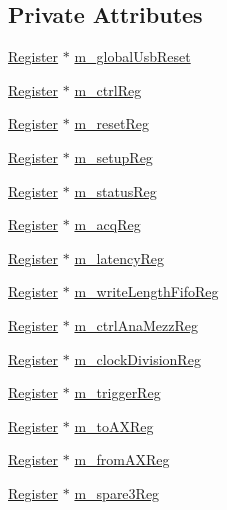 \subsection*{Private Attributes}
\begin{DoxyCompactItemize}
\item 
\hyperlink{classRegister}{Register} $\ast$ \hyperlink{classA3PE_abd71e0c273f9e211e1a9302019129aff}{m\+\_\+global\+Usb\+Reset}
\item 
\hyperlink{classRegister}{Register} $\ast$ \hyperlink{classA3PE_a264834484dd6326ebad58c2a3e1be9a6}{m\+\_\+ctrl\+Reg}
\item 
\hyperlink{classRegister}{Register} $\ast$ \hyperlink{classA3PE_ab4db5f00976e5095686f108c8febf702}{m\+\_\+reset\+Reg}
\item 
\hyperlink{classRegister}{Register} $\ast$ \hyperlink{classA3PE_a142fa10b7e705c4701ae21678ec2ec8a}{m\+\_\+setup\+Reg}
\item 
\hyperlink{classRegister}{Register} $\ast$ \hyperlink{classA3PE_a2281e3d12a2dffad99ec55be2b695f53}{m\+\_\+status\+Reg}
\item 
\hyperlink{classRegister}{Register} $\ast$ \hyperlink{classA3PE_abaf426f4c9192537117b77f9f4821e04}{m\+\_\+acq\+Reg}
\item 
\hyperlink{classRegister}{Register} $\ast$ \hyperlink{classA3PE_a96a167e73e264da5a18d9ddb5ebb5f23}{m\+\_\+latency\+Reg}
\item 
\hyperlink{classRegister}{Register} $\ast$ \hyperlink{classA3PE_a9a0cb2253ea34c0be567a03684217fee}{m\+\_\+write\+Length\+Fifo\+Reg}
\item 
\hyperlink{classRegister}{Register} $\ast$ \hyperlink{classA3PE_a126a936a5fd4fd4b83485b3637e1fa84}{m\+\_\+ctrl\+Ana\+Mezz\+Reg}
\item 
\hyperlink{classRegister}{Register} $\ast$ \hyperlink{classA3PE_ae1f4c24a99c2e6ae944a080f429cc155}{m\+\_\+clock\+Division\+Reg}
\item 
\hyperlink{classRegister}{Register} $\ast$ \hyperlink{classA3PE_a750158ae488121ab7969452f061e678c}{m\+\_\+trigger\+Reg}
\item 
\hyperlink{classRegister}{Register} $\ast$ \hyperlink{classA3PE_abe8eb76e3c0d967403726143deb1b70f}{m\+\_\+to\+A\+X\+Reg}
\item 
\hyperlink{classRegister}{Register} $\ast$ \hyperlink{classA3PE_acbfe708ac0a81243959c96124f192b9e}{m\+\_\+from\+A\+X\+Reg}
\item 
\hyperlink{classRegister}{Register} $\ast$ \hyperlink{classA3PE_a1e7e5c89f190672990ae5bece2a8b1aa}{m\+\_\+spare3\+Reg}

\end{DoxyCompactItemize}
